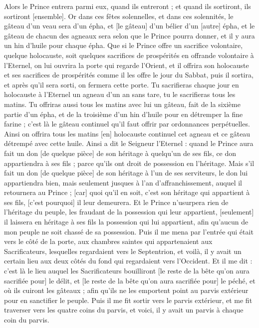 \begin{multicols}{2}
Alors le Prince entrera parmi eux, quand ils entreront ; et quand ils sortiront, ils sortiront [ensemble].
Or dans ces fêtes solennelles, et dans ces solennités, le gâteau d'un veau sera d'un épha, et [le gâteau] d'un bélier d'un [autre] épha, et le gâteau de chacun des agneaux sera selon que le Prince pourra donner, et il y aura un hin d'huile pour chaque épha.
Que si le Prince offre un sacrifice volontaire, quelque holocauste, soit quelques sacrifices de prospérités en offrande volontaire à l'Eternel, on lui ouvrira la porte qui regarde l'Orient, et il offrira son holocauste et ses sacrifices de prospérités comme il les offre le jour du Sabbat, puis il sortira, et après qu'il sera sorti, on fermera cette porte.
Tu sacrifieras chaque jour en holocauste à l'Eternel un agneau d'un an sans tare, tu le sacrifieras tous les matins.
Tu offriras aussi tous les matins avec lui un gâteau, fait de la sixième partie d'un épha, et de la troisième d'un hin d'huile pour en détremper la fine farine ; c'est là le gâteau continuel qu'il faut offrir par ordonnances perpétuelles.
Ainsi on offrira tous les matins [en] holocauste continuel cet agneau et ce gâteau détrempé avec cette huile.
Ainsi a dit le Seigneur l'Eternel : quand le Prince aura fait un don [de quelque pièce] de son héritage à quelqu'un de ses fils, ce don appartiendra à ses fils ; parce qu'ils ont droit de possession en l'héritage.
Mais s'il fait un don [de quelque pièce] de son héritage à l'un de ses serviteurs, le don lui appartiendra bien, mais seulement jusques à l'an d'affranchissement, auquel il retournera au Prince ; [car] quoi qu'il en soit, c'est son héritage qui appartient à ses fils, [c'est pourquoi] il leur demeurera.
Et le Prince n'usurpera rien de l'héritage du peuple, les fraudant de la possession qui leur appartient, [seulement] il laissera en héritage à ses fils la possession qui lui appartient, afin qu'aucun de mon peuple ne soit chassé de sa possession.
Puis il me mena par l'entrée qui était vers le côté de la porte, aux chambres saintes qui appartenaient aux Sacrificateurs, lesquelles regardaient vers le Septentrion, et voilà, il y avait un certain lieu aux deux côtés du fond qui regardaient vers l'Occident.
Et il me dit : c'est là le lieu auquel les Sacrificateurs bouilliront [le reste de la bête qu'on aura sacrifiée pour] le délit, et [le reste de la bête qu'on aura sacrifiée pour] le péché, et où ils cuiront les gâteaux ; afin qu'ils ne les emportent point au parvis extérieur pour en sanctifier le peuple.
Puis il me fit sortir vers le parvis extérieur, et me fit traverser vers les quatre coins du parvis, et voici, il y avait un parvis à chaque coin du parvis.

\end{multicols}
